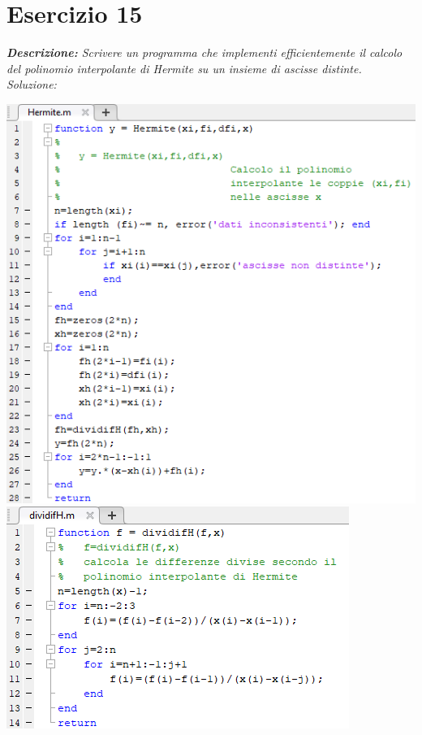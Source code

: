 \section{Esercizio 15}
\textit{\textbf{Descrizione:} Scrivere un programma che implementi efficientemente il calcolo del polinomio interpolante di Hermite su un insieme di ascisse distinte.}\newline
\noindent\emph{Soluzione: }\newline

\includegraphics[width=1.3\linewidth]{img/Hermite.png}
\includegraphics[width=1.3\linewidth]{img/dividifH.png}\newpage